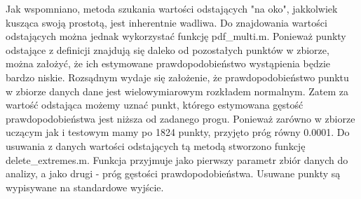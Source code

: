 \documentclass{article}
\begin{document}
	Jak wspomniano, metoda szukania wartości odstających "na oko", jakkolwiek kusząca swoją prostotą, jest inherentnie wadliwa. Do znajdowania wartości odstających można jednak wykorzystać funkcję pdf\_multi.m. Ponieważ punkty odstające z definicji znajdują się daleko od pozostałych punktów w zbiorze, można założyć, że ich estymowane prawdopodobieństwo wystąpienia będzie bardzo niskie. Rozsądnym wydaje się założenie, że prawdopodobieństwo punktu w zbiorze danych dane jest wielowymiarowym rozkładem normalnym. Zatem za wartość odstająca możemy uznać punkt, którego estymowana gęstość prawdopodobieństwa jest niższa od zadanego progu. Ponieważ zarówno w zbiorze uczącym jak i testowym mamy po 1824 punkty, przyjęto próg równy 0.0001. Do usuwania z danych wartości odstających tą metodą stworzono funkcję delete\_extremes.m. Funkcja przyjmuje jako pierwszy parametr zbiór danych do analizy, a jako drugi - próg gęstości prawdopodobieństwa. Usuwane punkty są wypisywane na standardowe wyjście. 
	
\end{document}
